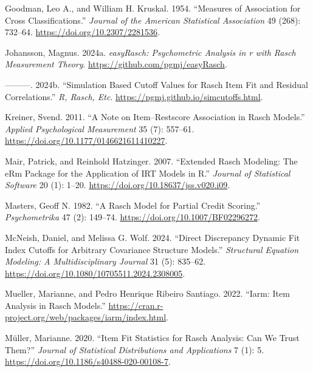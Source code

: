 \documentclass[
  letterpaper,
  DIV=11,
  numbers=noendperiod]{scrartcl}
\newlength{\cslhangindent}
\newenvironment{CSLReferences}[2] %
 {\begin{list}{}{%
  \setlength{\itemindent}{0pt}
  \setlength{\leftmargin}{0pt}
  \setlength{\parsep}{0pt}
  \ifodd #1
   \setlength{\leftmargin}{\cslhangindent}
   \setlength{\itemindent}{-1\cslhangindent}
  \fi
  \setlength{\itemsep}{#2\baselineskip}}}
 {\end{list}}
\begin{document}
\begin{CSLReferences}{1}{0}
Goodman, Leo A., and William H. Kruskal. 1954. {``Measures of
{Association} for {Cross} {Classifications}.''} \emph{Journal of the
American Statistical Association} 49 (268): 732--64.
\url{https://doi.org/10.2307/2281536}.

Johansson, Magnus. 2024a. \emph{easyRasch: Psychometric Analysis in r
with Rasch Measurement Theory}. \url{https://github.com/pgmj/easyRasch}.

---------. 2024b. {``Simulation Based Cutoff Values for {Rasch} Item Fit
and Residual Correlations.''} \emph{R, Rasch, Etc}.
\url{https://pgmj.github.io/simcutoffs.html}.

Kreiner, Svend. 2011. {``A {Note} on {Item}--{Restscore} {Association}
in {Rasch} {Models}.''} \emph{Applied Psychological Measurement} 35 (7):
557--61. \url{https://doi.org/10.1177/0146621611410227}.

Mair, Patrick, and Reinhold Hatzinger. 2007. {``Extended {Rasch}
{Modeling}: {The} {eRm} {Package} for the {Application} of {IRT}
{Models} in {R}.''} \emph{Journal of Statistical Software} 20 (1):
1--20. \url{https://doi.org/10.18637/jss.v020.i09}.

Masters, Geoff N. 1982. {``A {Rasch} {Model} for {Partial} {Credit}
{Scoring}.''} \emph{Psychometrika} 47 (2): 149--74.
\url{https://doi.org/10.1007/BF02296272}.

McNeish, Daniel, and Melissa G. Wolf. 2024. {``Direct {Discrepancy}
{Dynamic} {Fit} {Index} {Cutoffs} for {Arbitrary} {Covariance}
{Structure} {Models}.''} \emph{Structural Equation Modeling: A
Multidisciplinary Journal} 31 (5): 835--62.
\url{https://doi.org/10.1080/10705511.2024.2308005}.

Mueller, Marianne, and Pedro Henrique Ribeiro Santiago. 2022. {``Iarm:
{Item} {Analysis} in {Rasch} {Models}.''}
\url{https://cran.r-project.org/web/packages/iarm/index.html}.

Müller, Marianne. 2020. {``Item Fit Statistics for {Rasch} Analysis: Can
We Trust Them?''} \emph{Journal of Statistical Distributions and
Applications} 7 (1): 5.
\url{https://doi.org/10.1186/s40488-020-00108-7}.


\end{CSLReferences}
\end{document}

